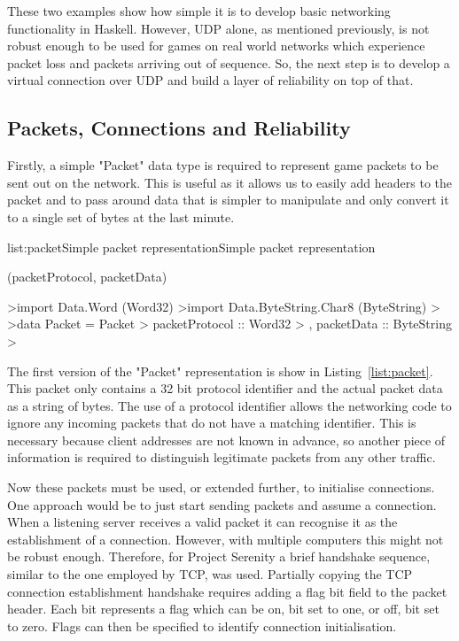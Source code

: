 These two examples show how simple it is to develop basic networking functionality in Haskell.
However, UDP alone, as mentioned previously, is not robust enough to be used for games on real
world networks which experience packet loss and packets arriving out of sequence. So, the next
step is to develop a virtual connection over UDP and build a layer of reliability on top of that.

\subsection{Packets, Connections and Reliability}

Firstly, a simple "Packet" data type is required to represent game packets to be sent out on
the network. This is useful as it allows us to easily add headers to the packet and to pass
around data that is simpler to manipulate and only convert it to a single set of bytes at the
last minute.

\vspace{-0.5em}
\begin{listing}{list:packet}{Simple packet representation}{Simple packet representation}{}
\end{listing}\vspace{-1.5em}

\functions(packetProtocol, packetData)
\begin{haskell}
>import Data.Word (Word32)
>import Data.ByteString.Char8 (ByteString)
>
>data Packet = Packet
>  { packetProtocol :: Word32
>  , packetData :: ByteString
>  }

\end{haskell}
\noindent
The first version of the "Packet" representation is show in Listing~\ref{list:packet}. This
packet only contains a 32 bit protocol identifier and the actual packet data as a string of
bytes. The use of a protocol identifier allows the networking code to ignore any incoming
packets that do not have a matching identifier. This is necessary because client addresses
are not known in advance, so another piece of information is required to distinguish legitimate
packets from any other traffic.

Now these packets must be used, or extended further, to initialise connections. One approach
would be to just start sending packets and assume a connection. When a listening server receives
a valid packet it can recognise it as the establishment of a connection. However, with multiple
computers this might not be robust enough. Therefore, for Project Serenity a brief handshake
sequence, similar to the one employed by TCP, was used. Partially copying the TCP connection
establishment handshake requires adding a flag bit field to the packet header. Each bit represents
a flag which can be on, bit set to one, or off, bit set to zero. Flags can then be specified
to identify connection initialisation.


